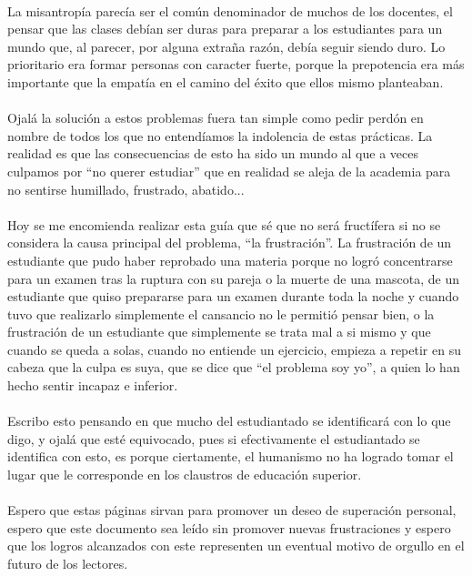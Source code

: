 \documentclass{book}
\begin{document}
        \paragraph{}La misantropía parecía ser el común denominador de muchos de los docentes, el pensar que las clases debían ser duras para preparar a los estudiantes para un mundo que, al parecer, por alguna extraña razón, debía seguir siendo duro. Lo prioritario era formar personas con caracter fuerte, porque la prepotencia era más importante que la empatía en el camino del éxito que ellos mismo planteaban.
        \paragraph{}Ojalá la solución a estos problemas fuera tan simple como pedir perdón en nombre de todos los que no entendíamos la indolencia de estas prácticas. La realidad es que las consecuencias de esto ha sido un mundo al que a veces culpamos por ``no querer estudiar'' que en realidad se aleja de la academia para no sentirse humillado, frustrado, abatido...
        \paragraph{}Hoy se me encomienda realizar esta guía que sé que no será fructífera si no se considera la causa principal del problema, ``la frustración''. La frustración de un estudiante que pudo haber reprobado una materia porque no logró concentrarse para un examen tras la ruptura con su pareja o la muerte de una mascota, de un estudiante que quiso prepararse para un examen durante toda la noche y cuando tuvo que realizarlo simplemente el cansancio no le permitió pensar bien, o la frustración de un estudiante que simplemente se trata mal a si mismo y que cuando se queda a solas, cuando no entiende un ejercicio, empieza a repetir en su cabeza que la culpa es suya, que se dice que ``el problema soy yo'', a quien lo han hecho sentir incapaz e inferior.
        \paragraph{}Escribo esto pensando en que mucho del estudiantado se identificará con lo que digo, y ojalá que esté equivocado, pues si efectivamente el estudiantado se identifica con esto, es porque ciertamente, el humanismo no ha logrado tomar el lugar que le corresponde en los claustros de educación superior.
        \paragraph{}Espero que estas páginas sirvan para promover un deseo de superación personal, espero que este documento sea leído sin promover nuevas frustraciones y espero que los logros alcanzados con este representen un eventual motivo de orgullo en el futuro de los lectores.
\end{document}
